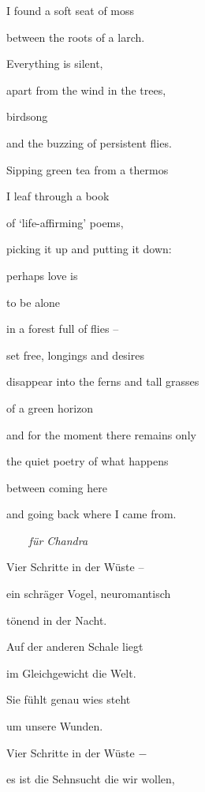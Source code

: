 \documentclass[a4paper]{article}
\begin{document}
I found a soft seat of moss 

between the roots of a larch.


\bigskip

Everything is silent, 

apart from the wind in the trees, 

birdsong

and the buzzing of persistent flies.


\bigskip

Sipping green tea from a thermos 

I leaf through a book 

of ‘life-affirming’ poems, 


\bigskip

picking it up and putting it down:


\bigskip

perhaps love is

to be alone

in a forest full of flies – 


\bigskip

set free, longings and desires

disappear into the ferns and tall grasses

of a green horizon


\bigskip

and for the moment there remains only 

the quiet poetry of what happens

between coming here

and going back where I came from.



\bigskip

{\itshape
\ \ \ \ für Chandra}


\bigskip

Vier Schritte in der Wüste – 

ein schräger Vogel, neuromantisch

tönend in der Nacht. 


\bigskip

Auf der anderen Schale liegt

im Gleichgewicht die Welt.

Sie fühlt genau wies steht

um unsere Wunden.


\bigskip

Vier Schritte in der Wüste $-$

es ist die Sehnsucht die wir wollen,
\end{document}
